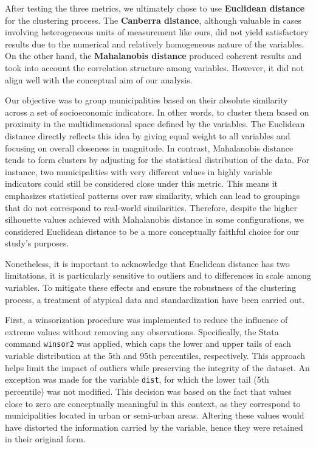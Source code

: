 \documentclass[a4paper,11pt,oneside]{article}
\begin{document}
\label{sec:appendix_A}

After testing the three metrics, we ultimately chose to use \textbf{Euclidean distance} for the clustering process. The \textbf{Canberra distance}, although valuable in cases involving heterogeneous units of measurement like ours, did not yield satisfactory results due to the numerical and relatively homogeneous nature of the variables. On the other hand, the \textbf{Mahalanobis distance} produced coherent results and took into account the correlation structure among variables. However, it did not align well with the conceptual aim of our analysis.

Our objective was to group municipalities based on their absolute similarity across a set of socioeconomic indicators. In other words, to cluster them based on proximity in the multidimensional space defined by the variables. The Euclidean distance directly reflects this idea by giving equal weight to all variables and focusing on overall closeness in magnitude. In contrast, Mahalanobis distance tends to form clusters by adjusting for the statistical distribution of the data. For instance, two municipalities with very different values in highly variable indicators could still be considered close under this metric. This means it emphasizes statistical patterns over raw similarity, which can lead to groupings that do not correspond to real-world similarities. Therefore, despite the higher silhouette values achieved with Mahalanobis distance in some configurations, we considered Euclidean distance to be a more conceptually faithful choice for our study’s purposes.

Nonetheless, it is important to acknowledge that Euclidean distance has two limitations, it is particularly sensitive to outliers and to differences in scale among variables. To mitigate these effects and ensure the robustness of the clustering process, a treatment of atypical data and standardization have been carried out.

First, a winsorization procedure was implemented to reduce the influence of extreme values without removing any observations. Specifically, the Stata command \texttt{winsor2} was applied, which caps the lower and upper tails of each variable distribution at the 5th and 95th percentiles, respectively. This approach helps limit the impact of outliers while preserving the integrity of the dataset. An exception was made for the variable \texttt{dist}, for which the lower tail (5th percentile) was not modified. This decision was based on the fact that values close to zero are conceptually meaningful in this context, as they correspond to municipalities located in urban or semi-urban areas. Altering these values would have distorted the information carried by the variable, hence they were retained in their original form.
\end{document}
